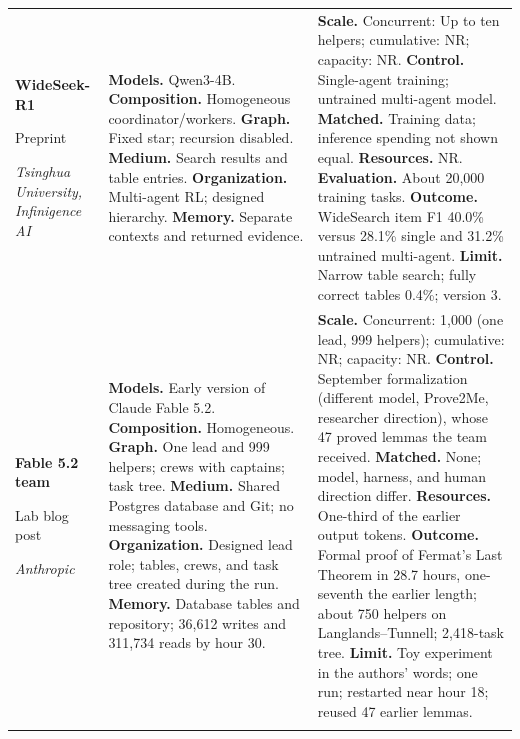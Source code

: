 \begin{longtable}{@{}>{\raggedright\arraybackslash}p{}>{\raggedright\arraybackslash}p{}>{\raggedright\arraybackslash}p{}@{}}
\textbf{WideSeek-R1}\par \citep{wideseek-r1}\par Preprint\par\emph{Tsinghua University, Infinigence AI} & \textbf{Models.} Qwen3-4B. \textbf{Composition.} Homogeneous coordinator/workers. \textbf{Graph.} Fixed star; recursion disabled. \textbf{Medium.} Search results and table entries. \textbf{Organization.} Multi-agent RL; designed hierarchy. \textbf{Memory.} Separate contexts and returned evidence. & \textbf{Scale.} Concurrent: Up to ten helpers; cumulative: NR; capacity: NR. \textbf{Control.} Single-agent training; untrained multi-agent model. \textbf{Matched.} Training data; inference spending not shown equal. \textbf{Resources.} NR. \textbf{Evaluation.} About 20,000 training tasks. \textbf{Outcome.} WideSearch item F1 40.0\% versus 28.1\% single and 31.2\% untrained multi-agent. \textbf{Limit.} Narrow table search; fully correct tables 0.4\%; version 3. \\ \addlinespace[5pt]
\textbf{Fable 5.2 team}\par \citep{anthropic-fable-team-scaling,fermat-last-theorem}\par Lab blog post\par\emph{Anthropic} & \textbf{Models.} Early version of Claude Fable 5.2. \textbf{Composition.} Homogeneous. \textbf{Graph.} One lead and 999 helpers; crews with captains; task tree. \textbf{Medium.} Shared Postgres database and Git; no messaging tools. \textbf{Organization.} Designed lead role; tables, crews, and task tree created during the run. \textbf{Memory.} Database tables and repository; 36,612 writes and 311,734 reads by hour 30. & \textbf{Scale.} Concurrent: 1,000 (one lead, 999 helpers); cumulative: NR; capacity: NR. \textbf{Control.} September formalization (different model, Prove2Me, researcher direction), whose 47 proved lemmas the team received. \textbf{Matched.} None; model, harness, and human direction differ. \textbf{Resources.} One-third of the earlier output tokens. \textbf{Outcome.} Formal proof of Fermat’s Last Theorem in 28.7 hours, one-seventh the earlier length; about 750 helpers on Langlands--Tunnell; 2,418-task tree. \textbf{Limit.} Toy experiment in the authors’ words; one run; restarted near hour 18; reused 47 earlier lemmas. \\ \addlinespace[5pt]

\end{longtable}

